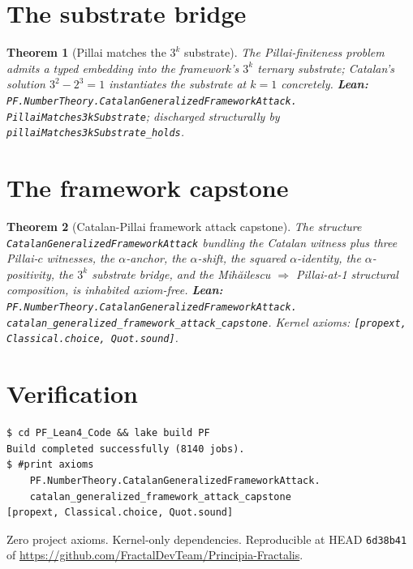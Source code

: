 \documentclass[11pt,a4paper]{article}
\theoremstyle{plain}
\newtheorem{theorem}{Theorem}[section]
\theoremstyle{definition}
\begin{document}
\section{The substrate bridge}

\begin{theorem}[Pillai matches the $3^{k}$ substrate]
\label{thm:pillai-substrate}
The Pillai-finiteness problem admits a typed embedding into the
framework's $3^{k}$ ternary substrate; Catalan's solution
$3^{2} - 2^{3} = 1$ instantiates the substrate at $k = 1$
concretely.
\textbf{Lean:}
\texttt{PF.NumberTheory.CatalanGeneralizedFrameworkAttack.\\
PillaiMatches3kSubstrate};
discharged structurally by
\texttt{pillaiMatches3kSubstrate\_holds}.
\end{theorem}

\section{The framework capstone}

\begin{theorem}[Catalan-Pillai framework attack capstone]
\label{thm:pillai-capstone}
The structure
\texttt{CatalanGeneralizedFrameworkAttack} bundling the Catalan
witness plus three Pillai-$c$ witnesses, the $\alpha$-anchor,
the $\alpha$-shift, the squared $\alpha$-identity, the
$\alpha$-positivity, the $3^{k}$ substrate bridge, and the
Mih\u{a}ilescu $\Rightarrow$ Pillai-at-1 structural composition,
is inhabited axiom-free.
\textbf{Lean:}
\texttt{PF.NumberTheory.CatalanGeneralizedFrameworkAttack.\\
catalan\_generalized\_framework\_attack\_capstone}.
Kernel axioms: \texttt{[propext, Classical.choice, Quot.sound]}.
\end{theorem}

\section{Verification}

\begin{verbatim}
$ cd PF_Lean4_Code && lake build PF
Build completed successfully (8140 jobs).
$ #print axioms
    PF.NumberTheory.CatalanGeneralizedFrameworkAttack.
    catalan_generalized_framework_attack_capstone
[propext, Classical.choice, Quot.sound]
\end{verbatim}

Zero project axioms. Kernel-only dependencies. Reproducible at
HEAD \texttt{6d38b41} of
\url{https://github.com/FractalDevTeam/Principia-Fractalis}.
\end{document}
